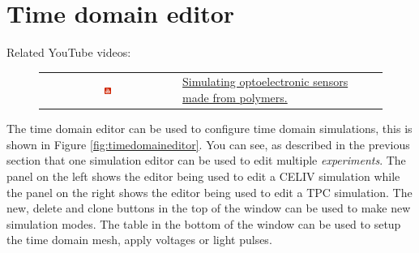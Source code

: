 \newpage
\section{Time domain editor}
Related YouTube videos:
\begin{figure}[H]

\begin{tabular}{ c l }

\includegraphics[width=0.05\textwidth]{./images/youtube.png}

&
\href{https://www.youtube.com/watch?v=D7yJLFmTAVQ}{Simulating optoelectronic sensors made from polymers.}

\end{tabular}
\end{figure}

The time domain editor can be used to configure time domain simulations, this is shown in Figure \ref{fig:timedomaineditor}.  You can see, as described in the previous section that one simulation editor can be used to edit multiple \emph{experiments}.  The panel on the left shows the editor being used to edit a CELIV simulation while the panel on the right shows the editor being used to edit a TPC simulation.  The new, delete and clone buttons in the top of the window can be used to make new simulation modes. The table in the bottom of the window can be used to setup the time domain mesh, apply voltages or light pulses.

